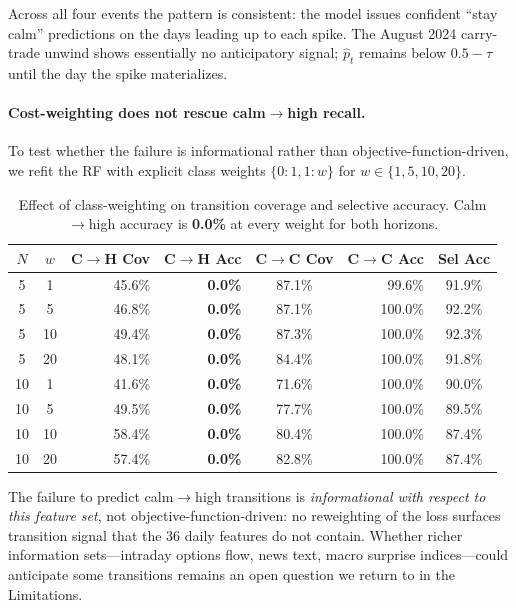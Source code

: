 \documentclass[12pt]{article}
\begin{document}
Across all four events the pattern is consistent: the model issues confident ``stay calm''
predictions on the days leading up to each spike. The August 2024 carry-trade unwind shows
essentially no anticipatory signal; $\hat{p}_t$ remains below $0.5 - \tau$ until the day the
spike materializes.

\paragraph{Cost-weighting does not rescue calm$\to$high recall.}
To test whether the failure is informational rather than objective-function-driven, we refit the RF
with explicit class weights $\{0{:}1, 1{:}w\}$ for $w \in \{1, 5, 10, 20\}$.

\begin{table}[H]
\centering
\caption{Effect of class-weighting on transition coverage and selective accuracy. Calm$\to$high
accuracy is \textbf{0.0\%} at every weight for both horizons.}
\label{tab:reweight}
\begin{tabular}{ccrrcrc}
\toprule
$N$ & $w$ & C$\to$H Cov & C$\to$H Acc & C$\to$C Cov & C$\to$C Acc & Sel Acc \\
\midrule
5 &  1 & 45.6\% & \textbf{0.0\%} & 87.1\% & 99.6\%  & 91.9\% \\
5 &  5 & 46.8\% & \textbf{0.0\%} & 87.1\% & 100.0\% & 92.2\% \\
5 & 10 & 49.4\% & \textbf{0.0\%} & 87.3\% & 100.0\% & 92.3\% \\
5 & 20 & 48.1\% & \textbf{0.0\%} & 84.4\% & 100.0\% & 91.8\% \\
\midrule
10 &  1 & 41.6\% & \textbf{0.0\%} & 71.6\% & 100.0\% & 90.0\% \\
10 &  5 & 49.5\% & \textbf{0.0\%} & 77.7\% & 100.0\% & 89.5\% \\
10 & 10 & 58.4\% & \textbf{0.0\%} & 80.4\% & 100.0\% & 87.4\% \\
10 & 20 & 57.4\% & \textbf{0.0\%} & 82.8\% & 100.0\% & 87.4\% \\
\bottomrule
\end{tabular}
\end{table}

The failure to predict calm$\to$high transitions is \emph{informational with respect to this
feature set}, not objective-function-driven: no reweighting of the loss surfaces transition
signal that the 36 daily features do not contain. Whether richer information
sets---intraday options flow, news text, macro surprise indices---could anticipate some
transitions remains an open question we return to in the Limitations.
\end{document}
